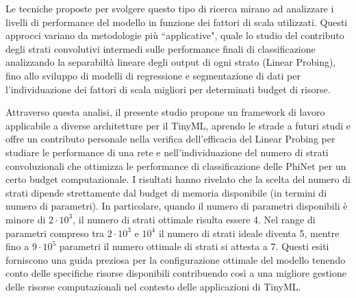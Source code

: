 


Le tecniche proposte per svolgere questo tipo di ricerca mirano ad analizzare i livelli di performance del modello in funzione dei fattori di scala utilizzati. Questi approcci variano da metodologie più ``applicative", quale lo studio del contributo degli strati convolutivi intermedi sulle performance finali di classificazione analizzando la separabiltà lineare degli output di ogni strato (Linear Probing), fino allo sviluppo di modelli di regressione e segmentazione di dati per l'individuazione dei fattori di scala migliori per determinati budget di risorse.

Attraverso questa analisi, il presente studio propone un framework di lavoro applicabile a diverse architetture per il TinyML, aprendo le strade a futuri studi e offre un contributo personale nella verifica dell'efficacia del Linear Probing per studiare le performance di una rete e nell'individuazione del numero di strati convoluzionali che ottimizza le performance di classificazione delle PhiNet per un certo budget computazionale.
I risultati hanno rivelato che la scelta del numero di strati dipende strettamente dal budget di memoria disponibile (in termini di numero di parametri). In particolare, quando il numero di parametri disponibili è minore di $2\cdot10^{3}$, il numero di strati ottimale risulta essere 4. Nel range di parametri compreso tra $2\cdot10^{3}$ e $10^{4}$ il numero di strati ideale diventa 5, mentre fino a $9\cdot10^{5}$ parametri il numero ottimale di strati si attesta a 7. Questi esiti forniscono una guida preziosa per la configurazione ottimale del modello tenendo conto delle specifiche risorse disponibili contribuendo così a una migliore gestione delle risorse computazionali nel contesto delle applicazioni di TinyML.


